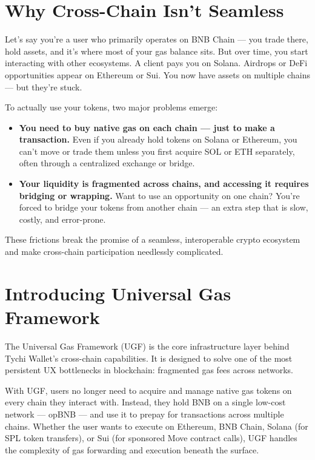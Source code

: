 \documentclass{article}
\begin{document}
\section*{Why Cross-Chain Isn’t Seamless}

Let’s say you’re a user who primarily operates on BNB Chain — you trade there, hold assets, and it's where most of your gas balance sits. But over time, you start interacting with other ecosystems. A client pays you on Solana. Airdrops or DeFi opportunities appear on Ethereum or Sui. You now have assets on multiple chains — but they’re stuck.

To actually use your tokens, two major problems emerge:

\begin{itemize}
  \item \textbf{You need to buy native gas on each chain — just to make a transaction.}  
  Even if you already hold tokens on Solana or Ethereum, you can’t move or trade them unless you first acquire SOL or ETH separately, often through a centralized exchange or bridge.
  
  \item \textbf{Your liquidity is fragmented across chains, and accessing it requires bridging or wrapping.}  
  Want to use an opportunity on one chain? You’re forced to bridge your tokens from another chain — an extra step that is slow, costly, and error-prone.
\end{itemize}

These frictions break the promise of a seamless, interoperable crypto ecosystem and make cross-chain participation needlessly complicated.



\section*{Introducing Universal Gas Framework}

The Universal Gas Framework (UGF) is the core infrastructure layer behind Tychi Wallet’s cross-chain capabilities. It is designed to solve one of the most persistent UX bottlenecks in blockchain: fragmented gas fees across networks.

With UGF, users no longer need to acquire and manage native gas tokens on every chain they interact with. Instead, they hold BNB on a single low-cost network — opBNB — and use it to prepay for transactions across multiple chains. Whether the user wants to execute on Ethereum, BNB Chain, Solana (for SPL token transfers), or Sui (for sponsored Move contract calls), UGF handles the complexity of gas forwarding and execution beneath the surface.
\end{document}
